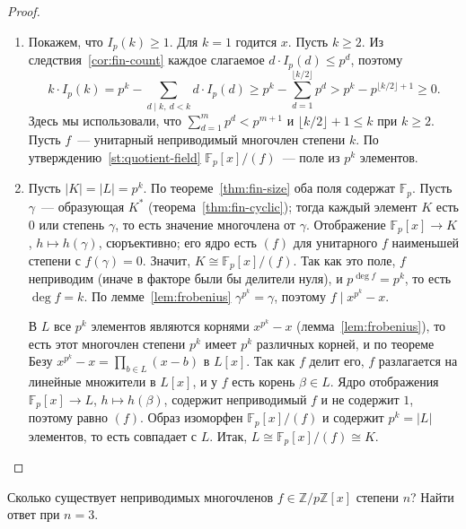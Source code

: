 \documentclass[12pt]{article}
\begin{document}
	\begin{proof}
		\begin{enumerate}
			\item Покажем, что $I_p(k) \geqslant 1$. Для $k = 1$ годится $x$. Пусть $k \geqslant 2$. Из следствия~\ref{cor:fin-count} каждое слагаемое $d \cdot I_p(d) \leqslant p^d$, поэтому
			\[
				k \cdot I_p(k) = p^k - \sum_{d \mid k,\ d < k} d \cdot I_p(d) \geqslant p^k - \sum_{d = 1}^{\lfloor k/2 \rfloor} p^d > p^k - p^{\lfloor k/2 \rfloor + 1} \geqslant 0.
			\]
			Здесь мы использовали, что $\sum_{d=1}^{m} p^d < p^{m+1}$ и $\lfloor k/2 \rfloor + 1 \leqslant k$ при $k \geqslant 2$. Пусть $f$~--- унитарный неприводимый многочлен степени $k$. По утверждению~\ref{st:quotient-field} $\mathbb{F}_p[x]/(f)$~--- поле из $p^k$ элементов.

			\item Пусть $|K| = |L| = p^k$. По теореме~\ref{thm:fin-size} оба поля содержат $\mathbb{F}_p$. Пусть $\gamma$~--- образующая $K^*$ (теорема~\ref{thm:fin-cyclic}); тогда каждый элемент $K$ есть $0$ или степень $\gamma$, то есть значение многочлена от $\gamma$. Отображение $\mathbb{F}_p[x] \to K$, $h \mapsto h(\gamma)$, сюръективно; его ядро есть $(f)$ для унитарного $f$ наименьшей степени с $f(\gamma) = 0$. Значит, $K \cong \mathbb{F}_p[x]/(f)$. Так как это поле, $f$ неприводим (иначе в факторе были бы делители нуля), и $p^{\deg f} = p^k$, то есть $\deg f = k$. По лемме~\ref{lem:frobenius} $\gamma^{p^k} = \gamma$, поэтому $f \mid x^{p^k} - x$.

			В $L$ все $p^k$ элементов являются корнями $x^{p^k} - x$ (лемма~\ref{lem:frobenius}), то есть этот многочлен степени $p^k$ имеет $p^k$ различных корней, и по теореме Безу $x^{p^k} - x = \prod_{b \in L} (x - b)$ в $L[x]$. Так как $f$ делит его, $f$ разлагается на линейные множители в $L[x]$, и у $f$ есть корень $\beta \in L$. Ядро отображения $\mathbb{F}_p[x] \to L$, $h \mapsto h(\beta)$, содержит неприводимый $f$ и не содержит $1$, поэтому равно $(f)$. Образ изоморфен $\mathbb{F}_p[x]/(f)$ и содержит $p^k = |L|$ элементов, то есть совпадает с $L$. Итак, $L \cong \mathbb{F}_p[x]/(f) \cong K$.
		\end{enumerate}
	\end{proof}

	\begin{problem}
		Сколько существует неприводимых многочленов $f \in \mathbb{Z}/p\mathbb{Z}[x]$ степени $n$? Найти ответ при $n = 3$.
	\end{problem}
\end{document}
